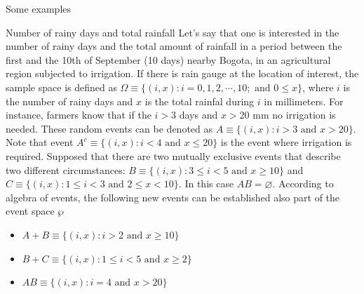 \documentclass[8pt]{beamer}
\begin{document}
\begin{frame}{Some examples}
    \begin{minipage}{0.59\textwidth}
    \begin{exampleblock}{Number of rainy days and total rainfall}
        Let's say that one is interested in the number of rainy days  and the total amount of rainfall in a period between the first and the 10th of September (10 days) nearby Bogota, in an agricultural region subjected to irrigation. If there is rain gauge at the location of interest, the sample space is defined as $\Omega \equiv \{ (i, x): i = 0, 1, 2, \cdots, 10; \text{ and } 0 \leq x\}$, where $i$ is the number of rainy days and $x$ is the total rainfal during $i$ in millimeters. For instance, farmers know that if the $i>3$ days and $x > 20$ mm  no irrigation is needed. These random events can be denoted as $A \equiv \{ (i, x) : i > 3 \text{ and } x > 20 \}$. Note that event $A^c \equiv \{ (i, x) : i < 4 \text{ and } x \leq 20 \}$ is the event where irrigation is required. Supposed that there are two mutually exclusive events that describe two different circumstances: $B \equiv \{ (i, x) : 3 \leq i < 5 \text{ and } x \geq 10 \}$ and $C \equiv \{ (i, x) : 1 \leq i < 3 \text{ and } 2 \leq x < 10 \}$. In this case $AB = \varnothing$. According to algebra of events, the following new events can be established also part of the event space $\wp$
        \begin{itemize}
            \item $A + B \equiv \{ (i, x) : i > 2 \text{ and } x \geq 10 \}$
            \item $B + C \equiv \{ (i, x) : 1 \leq i < 5 \text{ and } x \geq 2 \}$
            \item $AB \equiv \{ (i, x) : i = 4 \text{ and } x > 20 \}$
        \end{itemize}
        

\end{exampleblock}
\end{minipage}
\end{frame}
\end{document}
